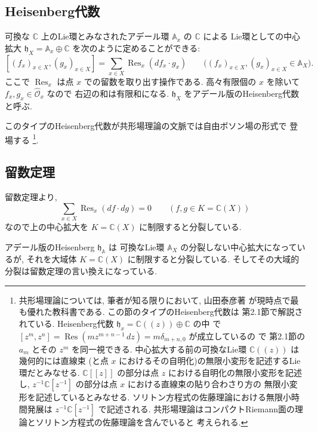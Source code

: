 \documentclass[12pt,twoside]{jarticle}
\newcommand\C{{\mathbb C}} %
\theoremstyle{definition} %
\theoremstyle{definition} %
\theoremstyle{definition} %
\numberwithin{theorem}{section}
\numberwithin{equation}{section}
\numberwithin{figure}{section}
\numberwithin{table}{section}
\newcommand\Res{\mathop{\mathrm{Res}}\nolimits}
\newcommand\h{{\mathfrak h}}
\newcommand\OO{{\mathcal O}}
\newcommand\Ohat{{\widehat \OO}}
\newcommand\A{{\mathbb A}}
\begin{document}

\subsection{Heisenberg代数}

可換な $\C$ 上のLie環とみなされたアデール環 $\A_x$ の $\C$ による
Lie環としての中心拡大 $\h_X=\A_x\oplus\C$ を次のように定めることができる:
\[
 [(f_x)_{x\in X}, (g_x)_{x\in X}] = \sum_{x\in X} \Res_x(df_x\cdot g_x)
 \qquad \bigl((f_x)_{x\in X}, (g_x)_{x\in X}\in\A_X\bigr).
\]
ここで $\Res_x$ は点 $x$ での留数を取り出す操作である. 
高々有限個の $x$ を除いて $f_x,g_x\in\Ohat_x$ なので
右辺の和は有限和になる.
$\h_X$ をアデール版のHeisenberg代数と呼ぶ.

このタイプのHeisenberg代数が共形場理論の文脈では自由ボソン場の形式で
登場する%
\footnote{共形場理論については, 筆者が知る限りにおいて, 
山田泰彦著 \cite{yamada} が現時点で最も優れた教科書である.
この節のタイプのHeisenberg代数は \cite{yamada} 第2.1節で解説されている.
Heisenberg代数 $\h_x=\C((z))\oplus\C$ の中
で $[z^m,z^n]=\Res(mz^{m+n-1}\,dz)=m\delta_{m+n,0}$ が成立しているの
で \cite{yamada} 第2.1節の $a_m$ とその $z^m$ を同一視できる.
中心拡大する前の可換なLie環 $\C((z))$ は幾何的には直線束
(と点 $x$ におけるその自明化)の無限小変形を記述するLie環だとみなせる.
$\C[[z]]$ の部分は点 $z$ における自明化の無限小変形を記述し, 
$z^{-1}\C[z^{-1}]$ の部分は点 $x$ における直線束の貼り合わさり方の
無限小変形を記述しているとみなせる.
ソリトン方程式の佐藤理論における無限小時間発展は $z^{-1}\C[z^{-1}]$ で記述される. 
共形場理論はコンパクトRiemann面の理論とソリトン方程式の佐藤理論を含んでいると
考えられる. 
}.


\subsection{留数定理}

留数定理より,
\[
\sum_{x\in X} \Res_x(df\cdot dg)=0 \qquad (f,g\in K=\C(X))
\]
なので上の中心拡大を $K=\C(X)$ に制限すると分裂している.

アデール版のHeisenberg $\h_\A$ は
可換なLie環 $\A_X$ の分裂しない中心拡大になっているが, 
それを大域体 $K=\C(X)$ に制限すると分裂している.
そしてその大域的分裂は留数定理の言い換えになっている.
\end{document}
